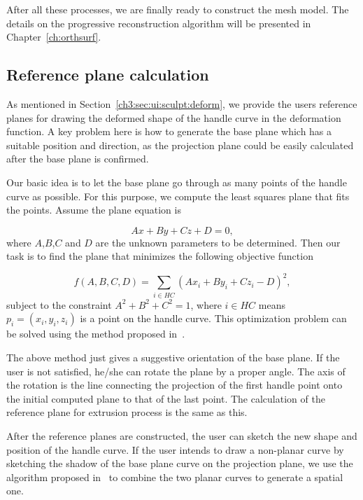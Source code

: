 After all these processes, we are finally ready to construct  the
mesh model. The details on the progressive reconstruction algorithm
will be presented in Chapter~\ref{ch:orthsurf}.


\subsection{Reference plane calculation}
\label{ch3:sec:algo:refplane}

As mentioned in Section~\ref{ch3:sec:ui:sculpt:deform}, we provide
the users reference planes for drawing the deformed shape of the
handle curve in the deformation function. A key problem here is how
to generate the base plane which has a suitable position and
direction, as the projection plane could be easily calculated after
the base plane is confirmed.

Our basic idea is to let the base plane go through as many points of
the handle curve as possible. For this purpose, we compute the least
squares plane that fits the points. Assume the plane equation is

\begin{equation}
\label{eq:planefunc}
    Ax+By+Cz+D=0,\nonumber
\end{equation}
where $A$,$B$,$C$ and $D$ are the unknown parameters to be determined. Then our task is to find the plane that minimizes the following objective function

\begin{equation}
\label{eq:planeobjnoZ0}
    f(A,B,C,D)=\sum\limits_{i \in HC} {(Ax_i+By_i+Cz_i-D)^2},
\end{equation}
subject to the constraint $A^2+B^2+C^2=1$, where $i \in HC$  means
$p_i=(x_i,y_i,z_i)$ is a point on the handle curve. This
optimization problem can be solved using the method proposed
in~\cite{SWMB59}.

The above method just gives a suggestive orientation of the base
plane. If the user is not satisfied, he/she can rotate the plane by
a proper angle. The axis of the rotation is the line connecting the
projection of the first handle point onto the initial computed plane
to that of the last point. The calculation of the reference plane
for extrusion process is the same as this.

After the reference planes are constructed, the user can sketch the
new shape and position of the handle curve. If the user intends to
draw a non-planar curve by sketching the shadow of the base plane
curve on the projection plane, we use the algorithm proposed
in~\cite{CMZHB99} to combine the two planar curves to generate a
spatial one.


